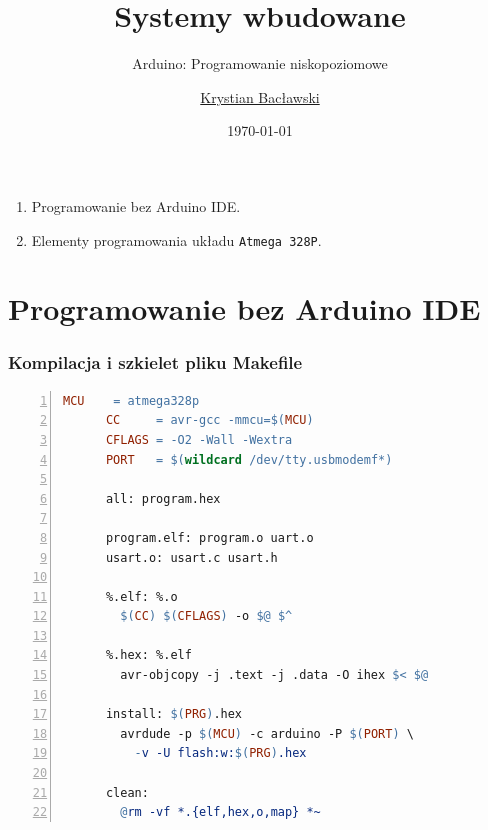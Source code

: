 \documentclass[8pt]{beamer}
\title{Systemy wbudowane}
\subtitle{Arduino: Programowanie niskopoziomowe}
\author[Krystian Bacławski]{\href{mailto:cahirwpz@cs.uni.wroc.pl}{Krystian Bacławski}}
\institute[Instytut Informatyki]{Uniwersytet Wrocławski}
\date{\today}
\begin{document}
\begin{frame}
  \titlepage
\end{frame}

\begin{frame}
  \begin{enumerate}
    \item Programowanie bez Arduino IDE.
    \item Elementy programowania układu \texttt{Atmega 328P}.
  \end{enumerate}
\end{frame}

\section*{Programowanie bez Arduino IDE}

\begin{frame}[fragile]
  \frametitle{Kompilacja i szkielet pliku Makefile}

  \begin{exampleblock}{}
    \begin{lstlisting}[language=make,numbers=left]
      MCU    = atmega328p
      CC     = avr-gcc -mmcu=$(MCU)
      CFLAGS = -O2 -Wall -Wextra
      PORT   = $(wildcard /dev/tty.usbmodemf*)

      all: program.hex

      program.elf: program.o uart.o
      usart.o: usart.c usart.h

      %.elf: %.o
        $(CC) $(CFLAGS) -o $@ $^

      %.hex: %.elf
        avr-objcopy -j .text -j .data -O ihex $< $@

      install: $(PRG).hex
        avrdude -p $(MCU) -c arduino -P $(PORT) \
          -v -U flash:w:$(PRG).hex 

      clean:
        @rm -vf *.{elf,hex,o,map} *~
    \end{lstlisting}
  \end{exampleblock}
\end{frame}
\end{document}
